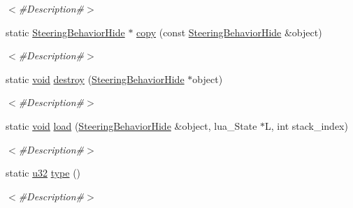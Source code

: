 \begin{DoxyCompactItemize}
\begin{DoxyCompactList}\small\item\em $<$\#\+Description\#$>$ \end{DoxyCompactList}\item 
static \mbox{\hyperlink{classnjli_1_1_steering_behavior_hide}{Steering\+Behavior\+Hide}} $\ast$ \mbox{\hyperlink{classnjli_1_1_steering_behavior_hide_a89d2803a9d246b04c9de95b7ce9d022f}{copy}} (const \mbox{\hyperlink{classnjli_1_1_steering_behavior_hide}{Steering\+Behavior\+Hide}} \&object)
\begin{DoxyCompactList}\small\item\em $<$\#\+Description\#$>$ \end{DoxyCompactList}\item 
static \mbox{\hyperlink{_thread_8h_af1e856da2e658414cb2456cb6f7ebc66}{void}} \mbox{\hyperlink{classnjli_1_1_steering_behavior_hide_ac30c8dd972afe41766a71d66298a5585}{destroy}} (\mbox{\hyperlink{classnjli_1_1_steering_behavior_hide}{Steering\+Behavior\+Hide}} $\ast$object)
\begin{DoxyCompactList}\small\item\em $<$\#\+Description\#$>$ \end{DoxyCompactList}\item 
static \mbox{\hyperlink{_thread_8h_af1e856da2e658414cb2456cb6f7ebc66}{void}} \mbox{\hyperlink{classnjli_1_1_steering_behavior_hide_accb443030b5c8985fa75d30d15d34355}{load}} (\mbox{\hyperlink{classnjli_1_1_steering_behavior_hide}{Steering\+Behavior\+Hide}} \&object, lua\+\_\+\+State $\ast$L, int stack\+\_\+index)
\begin{DoxyCompactList}\small\item\em $<$\#\+Description\#$>$ \end{DoxyCompactList}\item 
static \mbox{\hyperlink{_util_8h_a10e94b422ef0c20dcdec20d31a1f5049}{u32}} \mbox{\hyperlink{classnjli_1_1_steering_behavior_hide_a02ebee0ce5b418875b4a367cb817465d}{type}} ()
\begin{DoxyCompactList}\small\item\em $<$\#\+Description\#$>$ \end{DoxyCompactList}\end{DoxyCompactItemize}
